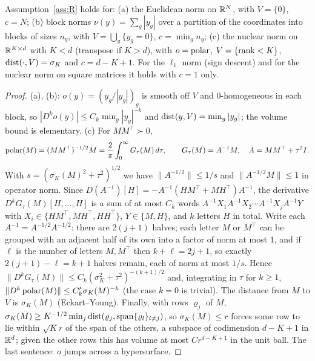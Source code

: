 \begin{lemma}[examples]\label{lem:examples}
Assumption~\ref{ass:R} holds for: \textup{(a)} the Euclidean norm on $\mathbb{R}^N$, with $V=\{0\}$, $c=N$; \textup{(b)}
block norms $\nu(y)=\sum_g|y_g|$ over a partition of the coordinates into blocks of sizes $n_g$, with
$V=\bigcup_g\{y_g=0\}$, $c=\min_gn_g$; \textup{(c)} the nuclear norm on $\mathbb{R}^{K\times d}$ with $K<d$ (transpose if $K>d$),
with $o=\operatorname{polar}$, $V=\{\operatorname{rank}<K\}$, $\operatorname{dist}(\cdot,V)=\sigma_K$ and $c=d-K+1$. For the $\ell_1$ norm (sign descent) and for
the nuclear norm on square matrices it holds with $c=1$ only.
\end{lemma}
\begin{proof}
(a), (b): $o(y)=(y_g/|y_g|)_g$ is smooth off $V$ and $0$-homogeneous in each block, so $|D^ko(y)|\le C_k\min_g|y_g|^{-k}$
and $\operatorname{dist}(y,V)=\min_g|y_g|$; the volume bound is elementary. (c) For $MM^\top\succ0$,
\[
\operatorname{polar}(M)=(MM^\top)^{-1/2}M=\frac2\pi\int_0^\infty G_\tau(M)\,d\tau,\qquad G_\tau(M)=A^{-1}M,\quad A=MM^\top+\tau^2I .
\]
With $s=(\sigma_K(M)^2+\tau^2)^{1/2}$ we have $\|A^{-1/2}\|\le1/s$ and $\|A^{-1/2}M\|\le1$ in operator norm. Since
$D(A^{-1})[H]=-A^{-1}(HM^\top+MH^\top)A^{-1}$, the derivative $D^kG_\tau(M)[H,\dots,H]$ is a sum of at most $C_k$ words
$A^{-1}X_1A^{-1}X_2\cdots A^{-1}X_jA^{-1}Y$ with $X_i\in\{HM^\top,MH^\top,HH^\top\}$, $Y\in\{M,H\}$, and $k$ letters $H$
in total. Write each $A^{-1}=A^{-1/2}A^{-1/2}$: there are $2(j+1)$ halves; each letter $M$ or $M^\top$ can be grouped
with an adjacent half of its own into a factor of norm at most $1$, and if $\ell$ is the number of letters $M,M^\top$
then $k+\ell=2j+1$, so exactly $2(j+1)-\ell=k+1$ halves remain, each of norm at most $1/s$. Hence
$\|D^kG_\tau(M)\|\le C_k(\sigma_K^2+\tau^2)^{-(k+1)/2}$ and, integrating in $\tau$ for $k\ge1$,
$\|D^k\operatorname{polar}(M)\|\le C_k'\sigma_K(M)^{-k}$ (the case $k=0$ is trivial). The distance from $M$ to $V$ is $\sigma_K(M)$
(Eckart--Young). Finally, with rows $\varrho_j$ of $M$,
$\sigma_K(M)\ge K^{-1/2}\min_j\operatorname{dist}(\varrho_j,\operatorname{span}\{\varrho_l\}_{l\ne j})$, so $\sigma_K(M)\le r$ forces some
row to lie within $\sqrt Kr$ of the span of the others, a subspace of codimension $d-K+1$ in $\mathbb{R}^d$; given the other
rows this has volume at most $C r^{d-K+1}$ in the unit ball. The last sentence: $o$ jumps across a hypersurface.
\end{proof}

